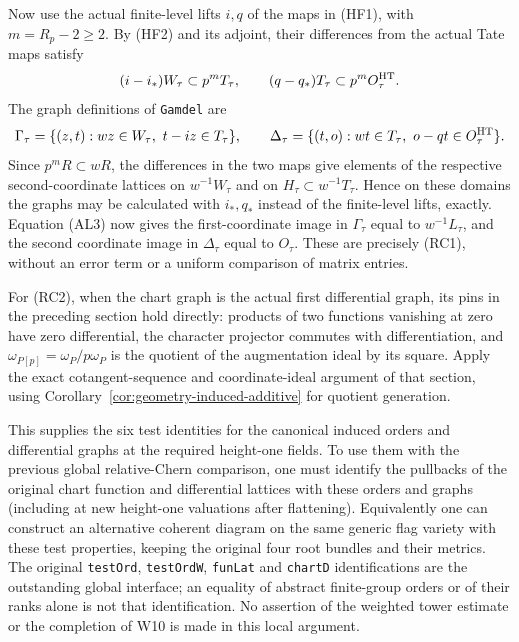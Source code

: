 Now use the actual finite-level lifts \(i,q\) of the maps
in (HF1), with \(m=R_p-2\ge2\).
By (HF2) and its adjoint, their differences from the actual
Tate maps satisfy
\[
 (i-i_*)W_\tau\subset p^m T_\tau,\qquad
 (q-q_*)T_\tau\subset p^m O_\tau^{\rm HT}.
\]
The graph definitions of \texttt{Gamdel} are
\[
 \Gamma_\tau=\{(z,t):wz\in W_\tau,\ t-iz\in T_\tau\},
 \qquad
 \Delta_\tau=\{(t,o):wt\in T_\tau,\
                    o-qt\in O_\tau^{\rm HT}\}.
\]
Since \(p^mR\subset wR\), the differences in the two maps
give elements of the respective second-coordinate lattices
on \(w^{-1}W_\tau\) and on \(H_\tau\subset w^{-1}T_\tau\).
Hence on these domains the graphs may be calculated with
\(i_*,q_*\) instead of the finite-level lifts, exactly.
Equation (AL3) now gives the first-coordinate image in
\(\Gamma_\tau\) equal to \(w^{-1}L_\tau\), and the second
coordinate image in \(\Delta_\tau\) equal to
\(O_\tau\). These are precisely (RC1), without an error
term or a uniform comparison of matrix entries.

For (RC2), when the chart graph is the actual first
differential graph, its pins in the preceding section
hold directly: products of two functions vanishing at
zero have zero differential, the character projector
commutes with differentiation, and
\(\omega_{P[p]}=\omega_P/p\omega_P\) is the quotient of
the augmentation ideal by its square. Apply the exact
cotangent-sequence and coordinate-ideal argument of that
section, using Corollary~\ref{cor:geometry-induced-additive}
for quotient generation.

This supplies the six test identities for the canonical
induced orders and differential graphs at the required
height-one fields. To use them with the previous global
relative-Chern comparison, one must identify the pullbacks
of the original chart function and differential lattices
with these orders and graphs (including at new height-one
valuations after flattening). Equivalently one can construct
an alternative coherent diagram on the same generic flag
variety with these test properties, keeping the original
four root bundles and their metrics. The original
\texttt{testOrd}, \texttt{testOrdW}, \texttt{funLat}
and \texttt{chartD} identifications are the outstanding
global interface; an equality of abstract finite-group
orders or of their ranks alone is not that identification.
No assertion of the weighted tower estimate or the
completion of W10 is made in this local argument.
